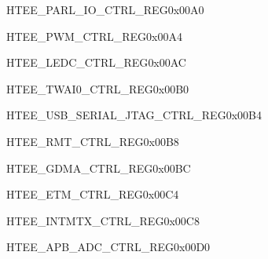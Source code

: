 \begin{register}{H}{TEE\_PARL\_IO\_CTRL\_REG}{0x00A0}\label{regdesc:TEEPARLIOCTRLREG}
\end{register}\vspace{-3em}

\begin{register}{H}{TEE\_PWM\_CTRL\_REG}{0x00A4}\label{regdesc:TEEPWMCTRLREG}
\end{register}\vspace{-3em}

\begin{register}{H}{TEE\_LEDC\_CTRL\_REG}{0x00AC}\label{regdesc:TEELEDCCTRLREG}
\end{register}\vspace{-3em}

\begin{register}{H}{TEE\_TWAI0\_CTRL\_REG}{0x00B0}\label{regdesc:TEETWAI0CTRLREG}
\end{register}\vspace{-3em}

\begin{register}{H}{TEE\_USB\_SERIAL\_JTAG\_CTRL\_REG}{0x00B4}\label{regdesc:TEEUSBSERIALJTAGCTRLREG}
\end{register}\vspace{-3em}

\begin{register}{H}{TEE\_RMT\_CTRL\_REG}{0x00B8}\label{regdesc:TEERMTCTRLREG}
\end{register}\vspace{-3em}

\begin{register}{H}{TEE\_GDMA\_CTRL\_REG}{0x00BC}\label{regdesc:TEEGDMACTRLREG}
\end{register}\vspace{-3em}


\begin{register}{H}{TEE\_ETM\_CTRL\_REG}{0x00C4}\label{regdesc:TEEETMCTRLREG}
\end{register}\vspace{-3em}

\begin{register}{H}{TEE\_INTMTX\_CTRL\_REG}{0x00C8}\label{regdesc:TEEINTMTXCTRLREG}
\end{register}\vspace{-3em}

\begin{register}{H}{TEE\_APB\_ADC\_CTRL\_REG}{0x00D0}\label{regdesc:TEEAPBADCCTRLREG}
\end{register}\vspace{-3em}

